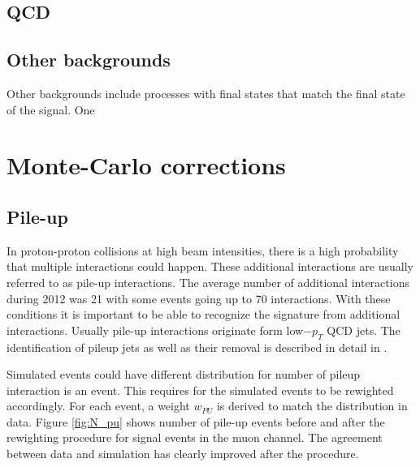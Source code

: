 \subsection{QCD}



\subsection{Other backgrounds}
Other backgrounds include processes with final states that match the final state of the signal. One 


\section{Monte-Carlo corrections}
\label{sec:mcSF}

\subsection{Pile-up}

In proton-proton collisions at high beam intensities, there is a high probability that multiple interactions could happen. These additional interactions are usually referred to as pile-up interactions. The average number of additional interactions during 2012 was 21 with some events going up to 70 interactions. With these conditions it is important to be able to recognize the signature from additional interactions. Usually pile-up interactions originate form low$-p_T$ QCD jets. The identification of pileup jets as well as their removal is described in detail in \cite{CMS:2013wea}. 
\par Simulated events could have different distribution for number of pileup interaction is an event. This requires for the simulated events to be rewighted accordingly. For each event, a weight $w_{PU}$ is derived to match the distribution in data. Figure \ref{fig:N_pu} shows number of pile-up events before and after the rewighting procedure for signal events in the muon channel. The agreement between data and simulation has clearly improved after the procedure. 

